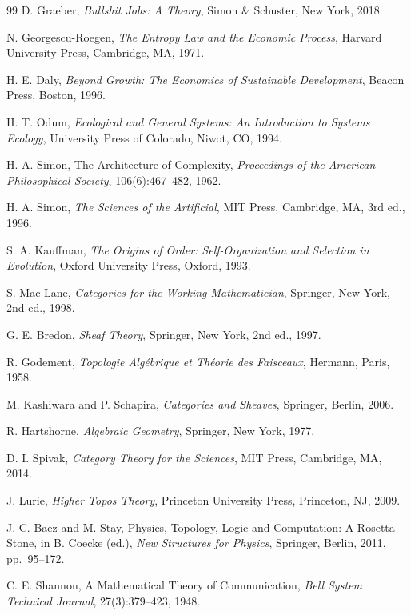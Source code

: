 \documentclass[12pt]{article}
\begin{document}
\begin{thebibliography}{99}
D. Graeber,
\textit{Bullshit Jobs: A Theory},
Simon \& Schuster, New York, 2018.

N. Georgescu-Roegen,
\textit{The Entropy Law and the Economic Process},
Harvard University Press, Cambridge, MA, 1971.

H. E. Daly,
\textit{Beyond Growth: The Economics of Sustainable Development},
Beacon Press, Boston, 1996.

H. T. Odum,
\textit{Ecological and General Systems: An Introduction to Systems Ecology},
University Press of Colorado, Niwot, CO, 1994.

H. A. Simon,
The Architecture of Complexity,
\textit{Proceedings of the American Philosophical Society}, 106(6):467--482, 1962.

H. A. Simon,
\textit{The Sciences of the Artificial},
MIT Press, Cambridge, MA, 3rd ed., 1996.

S. A. Kauffman,
\textit{The Origins of Order: Self-Organization and Selection in Evolution},
Oxford University Press, Oxford, 1993.

S. Mac Lane,
\textit{Categories for the Working Mathematician},
Springer, New York, 2nd ed., 1998.

G. E. Bredon,
\textit{Sheaf Theory},
Springer, New York, 2nd ed., 1997.

R. Godement,
\textit{Topologie Alg\'{e}brique et Th\'{e}orie des Faisceaux},
Hermann, Paris, 1958.

M. Kashiwara and P. Schapira,
\textit{Categories and Sheaves},
Springer, Berlin, 2006.

R. Hartshorne,
\textit{Algebraic Geometry},
Springer, New York, 1977.

D. I. Spivak,
\textit{Category Theory for the Sciences},
MIT Press, Cambridge, MA, 2014.

J. Lurie,
\textit{Higher Topos Theory},
Princeton University Press, Princeton, NJ, 2009.

J. C. Baez and M. Stay,
Physics, Topology, Logic and Computation: A Rosetta Stone,
in B. Coecke (ed.), \textit{New Structures for Physics},
Springer, Berlin, 2011, pp.~95--172.

C. E. Shannon,
A Mathematical Theory of Communication,
\textit{Bell System Technical Journal}, 27(3):379--423, 1948.


\end{thebibliography}
\end{document}
